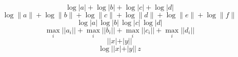 \documentclass{article}
\begin{document}
\[ \log|a|+\log|b|+\log|c|+\log|d| \]
\[ \log\|a\|+\log\|b\|+\log\|c\|+\log\|d\|+\log\|e\|+\log\|f\| \]
\[ \log|a|\,\log|b|\,\log|c|\,\log|d| \]
\[ \max_i||a_i||+\max_i||b_i||+\max_i||c_i||+\max_i||d_i|| \]
\[ ||x|+|y|| \]
\[ \log||x|+|y||\,z \]
\end{document}
